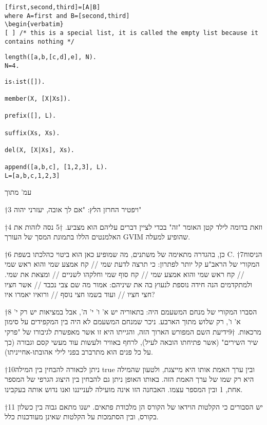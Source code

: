 \begin{verbatim}
[first,second,third]=[A|B]
where A=first and B=[second,third]
\begin{verbatim}
[ ] /* this is a special list, it is called the empty list because it contains nothing */
\end{verbatim}

\begin{verbatim}
length([a,b,[c,d],e], N).
N=4.
\end{verbatim}

\begin{verbatim}
isₗist([]).

member(X, [X|Xs]).

prefix([], L).

suffix(Xs, Xs).

del(X, [X|Xs], Xs).

append([a,b,c], [1,2,3], L).
L=[a,b,c,1,2,3]
\end{verbatim}

        עמ’ מתוך

†{3} ויפטיר החרזן הלץ: "אם לך אובה, יעזרני יהוה"

†{4} וזאת בדומה לילד קטן האומר "זה" בכדי לציין דברים עליהם הוא מצביע.
†{5} נסה לזהות את האלמנטים הללו בתמונת המסך של העורך GVIM שהופיע למעלה.

†{6} כן, בהגדרה מתאימה של משתנים, מה שמופיע כאן הוא ביטוי כהלכתו בשפת C.
†{7}הניסוח המקורי של הראב"ע קל יותר לפתרון: כי תרצה לדעת שמי // קח אמצע שמי והוא ראש שמי // קח ראש שמי והוא אמצע שמי // קח סוף שמי וחלקהו לשניים // ומצאת את שמי. ולמתקדמים הנה חידה נוספת לנעוץ בה את שיניהם: אמור מה שם צבי נכבד // אשר חציו חצי חציו // ועוד בשמו חצי נוסף // ורואיו יאמרו איו?

†{8} הסברו המקורי של מנחם המשעמם היה: בתאוריה יש א' ו' י' ה', אבל במציאות יש רק י' א' ו', רק שלוש מתוך הארבע. ניכר שמנחם המשעמם לא היה בין המקפידים על סימון מרכאות.
†{9}ידיעת השם המפורש הארוך הזה, והגייתו היא זו אשר מאפשרת לגיבורו של "פרקי שיר השירים" (אשר פתיחתו הובאה לעיל), לרחף באוויר ולעשות עוד מעשי קסם וגבורה (כך על כל פנים הוא מתרברב בפני לילי אהובתו-אחייניתו).

†{10}ניתן לכאורה להבחין בין המילה true ובין ערך האמת אותו היא מייצגת, ולטעון שהמילה היא רק שמו של ערך האמת הזה. באותו האופן ניתן גם להבחין בין היצוג הגרפי של המספר אחת, 1 ובין המספר עצמו. האבחנה הזו אינה מועילה לענייננו ואנו נדוש אותה בעקבינו.

†{11} יש הסבורים כי הקלטות הוידאו של הקורס הן מלכודת פתאים. ישנו מתאם גבוה בין כשלון בקורס, ובין הסתמכות על הקלטות שאינן מעודכנות כלל.

